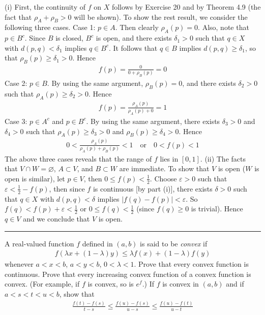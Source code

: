 \documentclass[12pt]{article}
\theoremstyle{definition}
\begin{document}
(i) First, the continuity of $f$ on $X$ follows by Exercise 20 and by Theorem 4.9 (the fact that $\rho_A+\rho_B>0$ will be shown). To show the rest result, we consider the following three cases.
Case 1: $p\in A$. Then clearly $\rho_A(p)=0$. Also, note that $p\in B^c$. Since $B$ is closed, $B^c$ is open, and there exists $\delta_1>0$ such that $q\in X$ with $d(p,q)<\delta_1$ implies $q\in B^c$. It follows that $q\in B$ implies $d(p,q)\ge\delta_1$, so that $\rho_B(p)\ge\delta_1>0$. Hence
\begin{align*}
f(p)=\frac{0}{0+\rho_B(p)}=0
\end{align*}
Case 2: $p\in B$. By using the same argument, $\rho_B(p)=0$, and there exists $\delta_2>0$ such that $\rho_A(p)\ge\delta_2>0$. Hence
\begin{align*}
f(p)=\frac{\rho_A(p)}{\rho_A(p)+0}=1
\end{align*}
Case 3: $p\in A^c$ and $p\in B^c$. By using the same argument, there exists $\delta_3>0$ and $\delta_4>0$ such that $\rho_A(p)\ge\delta_3>0$ and $\rho_B(p)\ge\delta_4>0$. Hence
\begin{align*}
0<\frac{\rho_A(p)}{\rho_A(p)+\rho_B(p)}<1\quad\mbox{or}\quad 0<f(p)<1
\end{align*}
The above three cases reveals that the range of $f$ lies in $[0,1]$.
(ii) The facts that $V\cap W=\varnothing$, $A\subset V$, and $B\subset W$ are immediate. To show that $V$ is open ($W$ is open is similar), let $p\in V$, then $0\le f(p)<\frac{1}{2}$. Choose $\varepsilon>0$ such that $\varepsilon<\frac{1}{2}-f(p)$, then since $f$ is continuous [by part (i)], there exists $\delta>0$ such that $q\in X$ with $d(p,q)<\delta$ implies $\left\vert f(q)-f(p)\right\vert<\varepsilon$. So $f(q)<f(p)+\varepsilon<\frac{1}{2}$ or $0\le f(q)<\frac{1}{2}$ (since $f(q)\ge 0$ is trivial). Hence $q\in V$ and we conclude that $V$ is open.



\bigskip\noindent\hrule\bigskip

A real-valued function $f$ defined in $(a,b)$ is said to be \textit{convex} if
\begin{align*}
f(\lambda x+(1-\lambda)y)\le\lambda f(x)+(1-\lambda)f(y)
\end{align*}
whenever $a<x<b$, $a<y<b$, $0<\lambda<1$. Prove that every convex function is continuous. Prove that every increasing convex function of a convex function is convex. (For example, if $f$ is convex, so is $e^f$.)
If $f$ is convex in $(a,b)$ and if $a<s<t<u<b$, show that
\begin{align*}
\frac{f(t)-f(s)}{t-s}\le\frac{f(u)-f(s)}{u-s}\le\frac{f(u)-f(t)}{u-t}
\end{align*}
\end{document}
